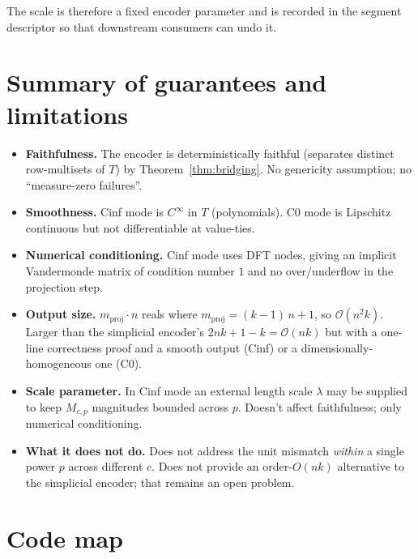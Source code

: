 \documentclass[a4paper,11pt]{article}
\begin{document}
The scale is therefore a fixed encoder parameter and is recorded in
the segment descriptor so that downstream consumers can undo it.

\section{Summary of guarantees and limitations}

\begin{itemize}[nosep]
  \item \textbf{Faithfulness.}  The encoder is deterministically
        faithful (separates distinct row-multisets of $T$) by
        Theorem~\ref{thm:bridging}.  No genericity assumption; no
        ``measure-zero failures''.
  \item \textbf{Smoothness.}  Cinf mode is $C^\infty$ in $T$
        (polynomials).  C0 mode is Lipschitz continuous but not
        differentiable at value-ties.
  \item \textbf{Numerical conditioning.}  Cinf mode uses DFT nodes,
        giving an implicit Vandermonde matrix of condition number $1$
        and no over/underflow in the projection step.
  \item \textbf{Output size.}  $m_{\text{proj}} \cdot n$ reals where
        $m_{\text{proj}} = (k-1)\,n + 1$, so $\mathcal{O}(n^2 k)$.
        Larger than the simplicial encoder's
        $2 n k + 1 - k = \mathcal{O}(nk)$ but with a one-line
        correctness proof and a smooth output (Cinf) or a
        dimensionally-homogeneous one (C0).
  \item \textbf{Scale parameter.}  In Cinf mode an external length
        scale $\lambda$ may be supplied to keep $M_{c, p}$ magnitudes
        bounded across $p$.  Doesn't affect faithfulness; only
        numerical conditioning.
  \item \textbf{What it does not do.}  Does not address the unit
        mismatch \emph{within} a single power $p$ across different
        $c$.  Does not provide an order-$O(nk)$ alternative to the
        simplicial encoder; that remains an open problem.
\end{itemize}

\section{Code map}
\end{document}
